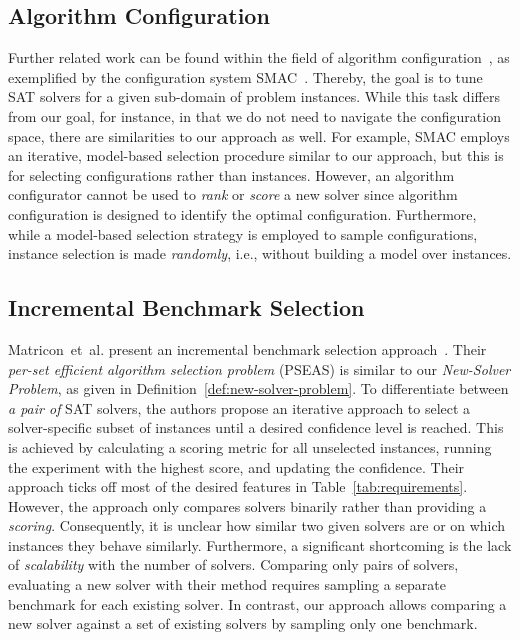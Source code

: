 \documentclass[sn-basic, Numbered]{sn-jnl} %
\begin{document}
\subsection{Algorithm Configuration}
\label{sec:related:algo-configuration}

Further related work can be found within the field of algorithm configuration~\cite{HoosHL21,Stutzle0P22}, as exemplified by the configuration system SMAC~\cite{HutterHL11}.
Thereby, the goal is to tune SAT solvers for a given sub-domain of problem instances.
While this task differs from our goal, for instance, in that we do not need to navigate the configuration space, there are similarities to our approach as well.
For example, SMAC employs an iterative, model-based selection procedure similar to our approach, but this is for selecting configurations rather than instances.
However, an algorithm configurator cannot be used to \emph{rank} or \emph{score} a new solver since algorithm configuration is designed to identify the optimal configuration.
Furthermore, while a model-based selection strategy is employed to sample configurations, instance selection is made \emph{randomly}, i.e., without building a model over instances.

\subsection{Incremental Benchmark Selection}
\label{sec:related:incremental-selection}

Matricon~et~al. present an incremental benchmark selection approach~\cite{MatriconAFSH21}.
Their \emph{per-set efficient algorithm selection problem} (PSEAS) is similar to our \emph{New-Solver Problem}, as given in Definition~\ref{def:new-solver-problem}.
To differentiate between \emph{a pair of} SAT solvers, the authors propose an iterative approach to select a solver-specific subset of instances until a desired confidence level is reached.
This is achieved by calculating a scoring metric for all unselected instances, running the experiment with the highest score, and updating the confidence.
Their approach ticks off most of the desired features in Table~\ref{tab:requirements}.
However, the approach only compares solvers binarily rather than providing a \emph{scoring}.
Consequently, it is unclear how similar two given solvers are or on which instances they behave similarly.
Furthermore, a significant shortcoming is the lack of \emph{scalability} with the number of solvers.
Comparing only pairs of solvers, evaluating a new solver with their method requires sampling a separate benchmark for each existing solver.
In contrast, our approach allows comparing a new solver against a set of existing solvers by sampling only one benchmark.
\end{document}
